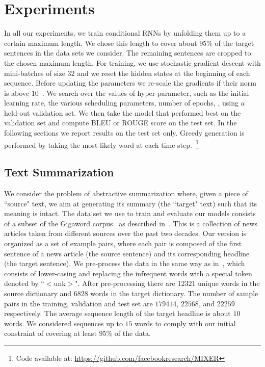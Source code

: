 \section{Experiments} \label{sec:experiments}
In all our experiments, we train conditional RNNs by unfolding them
up to a certain maximum length. 
We chose this length to cover about $95\%$ of the target sentences in the data sets we consider.
The remaining sentences are cropped to the chosen maximum length. 
For training, we use stochastic gradient descent
with mini-batches of size $32$ and we reset the hidden states at the
beginning of each sequence. Before updating the parameters we
re-scale the gradients if their norm is above $10$~\citep{mikolov-2010}.
We search over the values of hyper-parameter, such as the initial learning rate, 
the various scheduling parameters, number of epochs, \etc, using a held-out validation set. 
We then take the model that performed best on the validation set and compute BLEU or ROUGE 
score on the test set. In the following sections we report results on the test set only. 
Greedy generation is performed by taking the most likely word at each time step.~\footnote{Code available at: \url{https://github.com/facebookresearch/MIXER}} 

\subsection{Text Summarization}
We consider the problem of abstractive summarization where, 
given a piece of ``source" text, we aim at generating its summary (the ``target" text)
such that its meaning is intact.  
The data set we use to train and evaluate our models consists of a 
subset of the Gigaword corpus~\citep{gigaword} as described in~\citet{rush-2015}. 
This is a collection of news articles taken from different sources over the past two decades. 
Our version is organized as a set of example pairs, where each pair is composed of the 
first sentence of a news article (the source sentence) and its corresponding headline (the target sentence). 
We pre-process the data in the same way as in~\citep{rush-2015}, which consists of lower-casing 
and replacing the infrequent words with a special token denoted by ``$<$unk$>$". After 
pre-processing there are $12321$ unique words in the source dictionary and $6828$ words in the target dictionary. The number of sample pairs in the training, validation and test set are $179414$, $22568$, 
and $22259$ respectively. The average sequence length of the target headline is about $10$ words. 
We considered sequences up to $15$ words to comply with our initial constraint of covering at least
$95$\% of the data.

